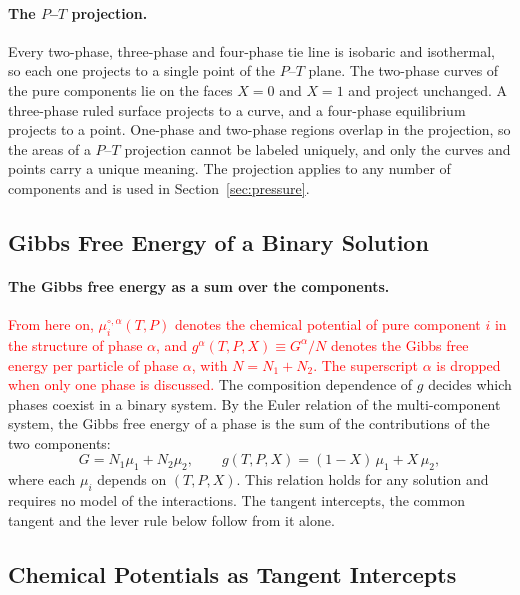 \paragraph{The $P$--$T$ projection.}
Every two-phase, three-phase and four-phase tie line is isobaric and
isothermal, so each one projects to a single point of the $P$--$T$ plane.
The two-phase curves of the pure components lie on the faces $X=0$ and
$X=1$ and project unchanged. A three-phase ruled surface projects to a
curve, and a four-phase equilibrium projects to a point. One-phase and
two-phase regions overlap in the projection, so the areas of a $P$--$T$
projection cannot be labeled uniquely, and only the curves and points carry
a unique meaning. The projection applies to any number of components and is
used in Section~\ref{sec:pressure}.

\subsection{Gibbs Free Energy of a Binary Solution}

\paragraph{The Gibbs free energy as a sum over the components.}
\textcolor{red}{From here on, $\mu_i^{\circ,\alpha}(T,P)$ denotes the
chemical potential of pure component $i$ in the structure of phase
$\alpha$, and $g^\alpha(T,P,X)\equiv G^\alpha/N$ denotes the Gibbs free
energy per particle of phase $\alpha$, with $N=N_1+N_2$. The superscript
$\alpha$ is dropped when only one phase is discussed.}
The composition dependence of $g$ decides which phases coexist in a binary
system. By the Euler relation of the multi-component system, the Gibbs free
energy of a phase is the sum of the contributions of the two components:
\begin{equation}
    \boxed{G=N_1\mu_1+N_2\mu_2,\qquad g(T,P,X)=(1-X)\,\mu_1+X\,\mu_2,}
    \label{eq:binary-euler}
\end{equation}
where each $\mu_i$ depends on $(T,P,X)$. This relation holds for any
solution and requires no model of the interactions. The tangent intercepts,
the common tangent and the lever rule below follow from it alone.

\subsection{Chemical Potentials as Tangent Intercepts}

